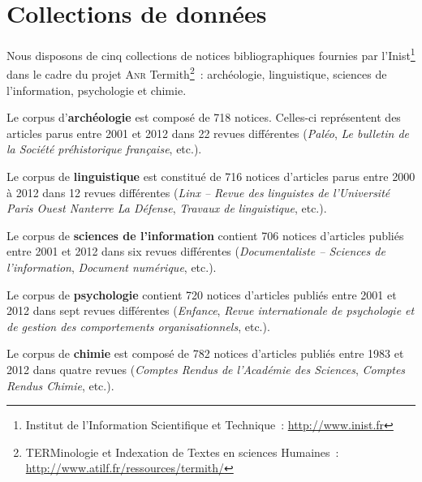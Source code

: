 \section{Collections de données}
\label{sec:presentation_des_donnees}
  Nous disposons de cinq collections de notices bibliographiques fournies par
  l'Inist\footnote{Institut de l'Information Scientifique et Technique~:
  \url{http://www.inist.fr}} dans le cadre du projet \textsc{Anr}
  Termith\footnote{TERMinologie et Indexation de Textes en sciences Humaines~:
  \url{http://www.atilf.fr/ressources/termith/}}~: archéologie, linguistique,
  sciences de l'information, psychologie et chimie.

  Le corpus d'\textbf{archéologie} est composé de 718 notices. Celles-ci
  représentent des articles parus entre 2001 et 2012 dans 22 revues différentes
  (\textit{Paléo}, \textit{Le bulletin de la Société préhistorique française},
  etc.).

  Le corpus de \textbf{linguistique} est constitué de 716 notices d'articles
  parus entre 2000 à 2012 dans 12 revues différentes (\textit{Linx -- Revue des
  linguistes de l'Université Paris Ouest Nanterre La Défense}, \textit{Travaux
  de linguistique}, etc.).

  Le corpus de \textbf{sciences de l'information} contient 706 notices
  d'articles publiés entre 2001 et 2012 dans six revues différentes
  (\textit{Documentaliste -- Sciences de l'information}, \textit{Document
  numérique}, etc.).

  Le corpus de \textbf{psychologie} contient 720 notices d'articles publiés
  entre 2001 et 2012 dans sept revues différentes (\textit{Enfance},
  \textit{Revue internationale de psychologie et de gestion des comportements
  organisationnels}, etc.).

  Le corpus de \textbf{chimie} est composé de 782 notices d'articles publiés
  entre 1983 et 2012 dans quatre revues (\textit{Comptes Rendus de l'Académie
  des Sciences}, \textit{Comptes Rendus Chimie}, etc.).

